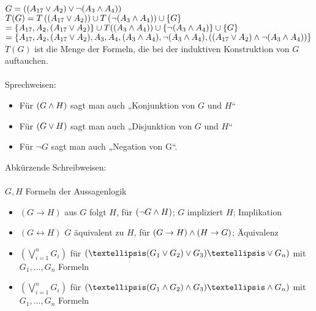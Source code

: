 \beispiel{}
$G= \left( (A_{17} \vee A_2) \vee \neg (A_3 \wedge A_4) \right)$\\
$T(G) = T \left( (A_{17} \vee A_2) \right) \cup T \left(\neg ( A_3 \wedge A_4) \right) \cup \{G\}$\\
$= \{ A_{17}, A_2, (A_{17} \vee A_2) \} \cup T((A_3 \wedge A_4)) \cup \{ \neg (A_3 \wedge A_4) \} \cup \{G\}$\\
$= \{A_{17}, A_2, (A_{17} \vee A_2), A_3, A_4, (A_3 \wedge A_4), \neg (A_3 \wedge A_4), \left( (A_{17} \vee A_2) \wedge \neg (A_3 \wedge A_4) \right) \}$\\
    
\bemerkung{}
$T(G)$ ist die Menge der Formeln, die bei der induktiven Konstruktion von $G$ auftauchen.\\
\noindent\\
Sprechweisen:
\begin{itemize}
\item Für $(G \wedge H)$ sagt man auch „Konjunktion von $G$ und $H$“
\item Für $(G \vee H)$ sagt man auch „Disjunktion von $G$ und $H$“
\item Für $\neg G$ sagt man auch „Negation von G“.
\end{itemize}

\vspace{1cm}
\noindent
Abkürzende Schreibweisen:\\
\noindent\\
$G, H$ Formeln der Aussagenlogik
\begin{itemize}
\item $(G \rightarrow H)$ aus $G$ folgt $H$, für $(\neg G \wedge H)$; $G$ impliziert $H$; Implikation
\item $(G \leftrightarrow H)$ $G$ äquivalent zu $H$, für $(G \rightarrow H) \wedge (H \rightarrow G)$; Äquivalenz
\item $( \bigvee_{i=1}^{n} G_i )$ für $\left( … (G_1 \OR G_2) \OR G_3 ) … \OR G_n \right)$ \hspace{1cm}mit $G_1, …, G_n$ Formeln
\item $( \bigvee_{i=1}^n G_i )$ für $\left(… ( G_1 \AND G_2) \AND G_3) … \AND G_n \right)$ \hspace{1cm}mit $G_1, …, G_n$ Formeln
\end{itemize}

